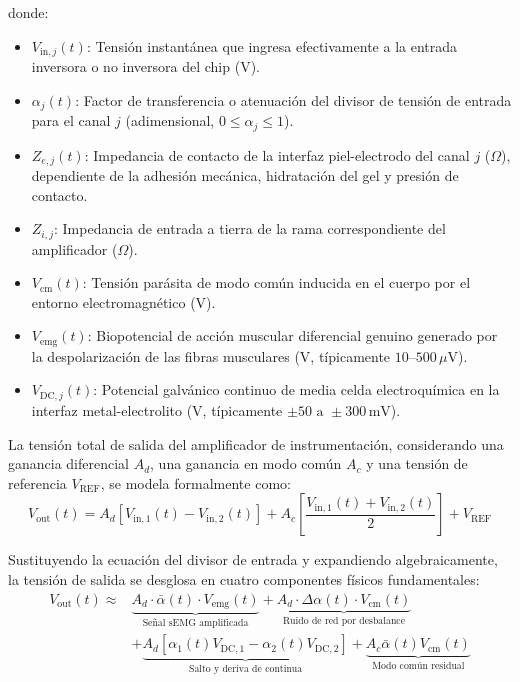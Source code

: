 \documentclass[11pt,a4paper]{article}
\begin{document}
donde:
\begin{itemize}
    \item $V_{\text{in}, j}(t)$: Tensión instantánea que ingresa efectivamente a la entrada inversora o no inversora del chip ($\text{V}$).
    \item $\alpha_j(t)$: Factor de transferencia o atenuación del divisor de tensión de entrada para el canal $j$ (adimensional, $0 \le \alpha_j \le 1$).
    \item $Z_{e, j}(t)$: Impedancia de contacto de la interfaz piel-electrodo del canal $j$ ($\Omega$), dependiente de la adhesión mecánica, hidratación del gel y presión de contacto.
    \item $Z_{i, j}$: Impedancia de entrada a tierra de la rama correspondiente del amplificador ($\Omega$).
    \item $V_{\text{cm}}(t)$: Tensión parásita de modo común inducida en el cuerpo por el entorno electromagnético ($\text{V}$).
    \item $V_{\text{emg}}(t)$: Biopotencial de acción muscular diferencial genuino generado por la despolarización de las fibras musculares ($\text{V}$, típicamente $10\text{--}500\,\mu\text{V}$).
    \item $V_{\text{DC}, j}(t)$: Potencial galvánico continuo de media celda electroquímica en la interfaz metal-electrolito ($\text{V}$, típicamente $\pm 50\text{ a } \pm 300\,\text{mV}$).
\end{itemize}

La tensión total de salida del amplificador de instrumentación, considerando una ganancia diferencial $A_d$, una ganancia en modo común $A_c$ y una tensión de referencia $V_{\text{REF}}$, se modela formalmente como:
\begin{equation}
V_{\text{out}}(t) = A_d \left[ V_{\text{in}, 1}(t) - V_{\text{in}, 2}(t) \right] + A_c \left[ \frac{V_{\text{in}, 1}(t) + V_{\text{in}, 2}(t)}{2} \right] + V_{\text{REF}}
\end{equation}

Sustituyendo la ecuación del divisor de entrada y expandiendo algebraicamente, la tensión de salida se desglosa en cuatro componentes físicos fundamentales:
\begin{align}
V_{\text{out}}(t) \approx & \underbrace{A_d \cdot \bar{\alpha}(t) \cdot V_{\text{emg}}(t)}_{\text{Señal sEMG amplificada}} + \underbrace{A_d \cdot \Delta\alpha(t) \cdot V_{\text{cm}}(t)}_{\text{Ruido de red por desbalance}} \nonumber \\
& + \underbrace{A_d \left[ \alpha_1(t) V_{\text{DC}, 1} - \alpha_2(t) V_{\text{DC}, 2} \right]}_{\text{Salto y deriva de continua}} + \underbrace{A_c \bar{\alpha}(t) V_{\text{cm}}(t)}_{\text{Modo común residual}}
\end{align}
\end{document}
